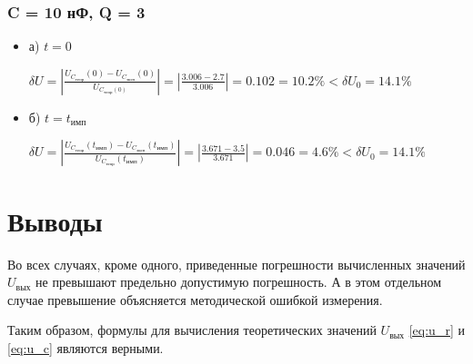 \documentclass[a4paper,14pt]{extarticle}
\begin{document}
\subsubsection{C = 10 нФ, Q = 3}

\begin{itemize}
	\item[] а) $t = 0$

	$\delta U = \left| \frac{U_{C_\text{теор}}(0) - U_{C_\text{эксп}}(0)}{U_{C_\text{теор}(0)}} \right| = \left| \frac{3.006 - 2.7}{3.006} \right| = 0.102 = 10.2\% < \delta U_0 = 14.1\%$

	\item[] б) $t = t_\text{имп}$

	$\delta U = \left| \frac{U_{C_\text{теор}}(t_\text{имп}) - U_{C_\text{эксп}}(t_\text{имп})}{U_{C_\text{теор}}(t_\text{имп})} \right| = \left| \frac{3.671 - 3.5}{3.671} \right| = 0.046 = 4.6\% < \delta U_0 = 14.1\%$
\end{itemize}
  
\section{Выводы}

Во всех случаях, кроме одного, приведенные погрешности вычисленных значений $U_\text{вых}$ не превышают предельно допустимую погрешность. А в этом отдельном случае превышение объясняется методической ошибкой измерения.

Таким образом, формулы для вычисления теоретических значений $U_\text{вых}$ \ref{eq:u_r} и \ref{eq:u_c} являются верными.
\end{document}
